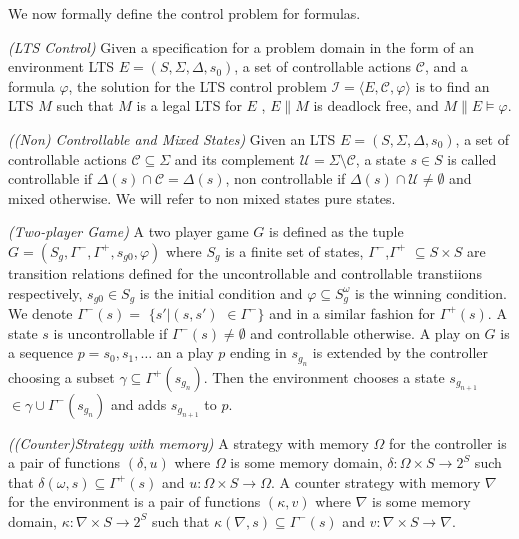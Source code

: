 %

We now formally define the control problem for \gr formulas.


\begin{definition}\label{def:lts-control}\emph{(LTS \gr Control)}
	Given a specification for a problem domain in the form of an environment LTS $E =  (S, \Sigma, \Delta, s_0)$, a set of controllable actions $\mathcal{C}$, and a \gr formula  $\varphi$, the solution for the LTS control problem $\mathcal{I}=\langle E, \mathcal{C}, \varphi\rangle$ is to find an LTS $M$ such that $M$ is a legal LTS for $E$ ,
	$E\|M$ is deadlock free, and $M\|E \models \varphi$.
\end{definition}

\begin{definition}\label{def:state-characterization}\emph{((Non) Controllable and Mixed States)}
	Given an LTS $E =  (S, \Sigma, \Delta, s_0)$, a set of controllable actions $\mathcal{C} \subseteq \Sigma$ and its complement $\mathcal{U} = \Sigma \setminus \mathcal{C}$,  a state $s \in S$ is called controllable if $\Delta(s) \cap \mathcal{C} = \Delta(s)$, non controllable if $\Delta(s) \cap \mathcal{U} \neq \emptyset$ and mixed otherwise.  We will refer to non mixed states pure states.
\end{definition}

\begin{definition}\label{def:twoplayer-game}\emph{(Two-player Game)}
	A two player game $G$ is defined as the tuple $G=(S_g,\Gamma^{-},\Gamma^{+},s_{g0}, \varphi)$ where $S_{g}$ is a finite set of states, $\Gamma^{-}$,$\Gamma^{+}$ $\subseteq S\times S$ are transition relations defined for the uncontrollable and controllable transtiions respectively, $s_{g0}\in S_{g}$ is the initial condition and $\varphi \subseteq S_{g}^{\omega}$ is the winning condition.  We denote $\Gamma^{-}(s) =$ $\{s'|(s,s')$ $\in \Gamma^{-}\}$ and in a similar fashion for $\Gamma^{+}(s)$. A state $s$ is uncontrollable if $\Gamma^{-}(s)\neq \emptyset$ and controllable otherwise.  A play on $G$ is a sequence $p=s_0,s_1,\ldots$ an a play $p$ ending in $s_{g_{n}}$ is extended by the controller choosing a subset $\gamma \subseteq \Gamma^{+}(s_{g_{n}})$.  Then the environment chooses a state $s_{g_{n+1}}$ $\in \gamma \cup \Gamma^{-}(s_{g_{n}})$ and adds $s_{g_{n+1}}$ to $p$.
\end{definition}

\begin{definition}\label{def:strategy}\emph{((Counter)Strategy with memory)}
	A strategy with memory $\Omega$ for the controller is a pair of functions $(\delta, u)$ where $\Omega$ is some memory domain, $\delta:\Omega\times S \rightarrow 2^{S}$ such that $\delta(\omega, s) \subseteq \Gamma^{+}(s)$ and $u:\Omega \times S \rightarrow \Omega$.
	A counter strategy with memory $\nabla$ for the environment is a pair of functions $(\kappa, v)$ where $\nabla$ is some memory domain, $\kappa:\nabla\times S \rightarrow 2^{S}$ such that $\kappa(\nabla, s) \subseteq \Gamma^{-}(s)$ and $v:\nabla \times S \rightarrow \nabla$.
\end{definition}


